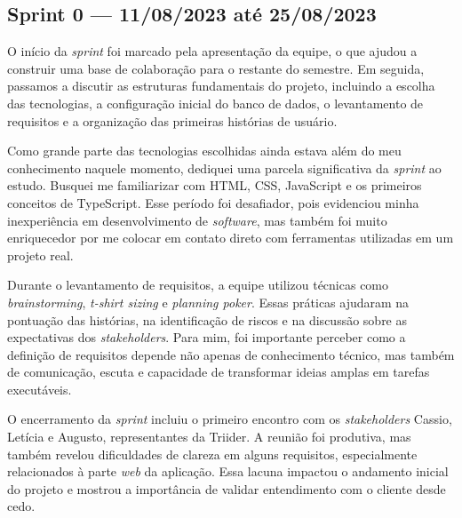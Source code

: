 \subsection{Sprint 0 --- 11/08/2023 até 25/08/2023}

O início da \textit{sprint} foi marcado pela apresentação da equipe, o que ajudou a construir uma base de colaboração para o restante do semestre. Em seguida, passamos a discutir as estruturas fundamentais do projeto, incluindo a escolha das tecnologias, a configuração inicial do banco de dados, o levantamento de requisitos e a organização das primeiras histórias de usuário.

Como grande parte das tecnologias escolhidas ainda estava além do meu conhecimento naquele momento, dediquei uma parcela significativa da \textit{sprint} ao estudo. Busquei me familiarizar com \ac{HTML}, \ac{CSS}, JavaScript e os primeiros conceitos de TypeScript. Esse período foi desafiador, pois evidenciou minha inexperiência em desenvolvimento de \textit{software}, mas também foi muito enriquecedor por me colocar em contato direto com ferramentas utilizadas em um projeto real.

Durante o levantamento de requisitos, a equipe utilizou técnicas como \textit{brainstorming}, \textit{t-shirt sizing} e \textit{planning poker}. Essas práticas ajudaram na pontuação das histórias, na identificação de riscos e na discussão sobre as expectativas dos \textit{stakeholders}. Para mim, foi importante perceber como a definição de requisitos depende não apenas de conhecimento técnico, mas também de comunicação, escuta e capacidade de transformar ideias amplas em tarefas executáveis.

O encerramento da \textit{sprint} incluiu o primeiro encontro com os \textit{stakeholders} Cassio, Letícia e Augusto, representantes da Triider. A reunião foi produtiva, mas também revelou dificuldades de clareza em alguns requisitos, especialmente relacionados à parte \textit{web} da aplicação. Essa lacuna impactou o andamento inicial do projeto e mostrou a importância de validar entendimento com o cliente desde cedo.
